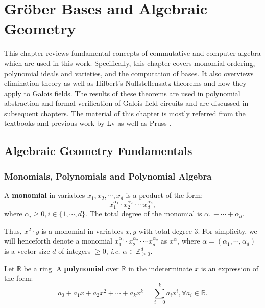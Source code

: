 \chapter{Gr\"ober Bases and Algebraic Geometry} \label{ch:ideals}
This chapter reviews fundamental concepts of commutative and 
computer algebra which are used in this work. 
Specifically, this chapter covers monomial ordering, polynomial ideals and 
varieties, and the computation of \Grobner bases.
It also overviews elimination theory as well as Hilbert's Nullstellensatz 
theorems and how
they apply to Galois fields. The results of these theorems are used in polynomial
abstraction and formal verification of Galois field circuits and 
are discussed 
in subsequent chapters. The material of this chapter is
mostly referred from the textbooks \cite{ideals:book,gb_book} and 
previous work by Lv \cite{lv:phd} as well as Pruss \cite{pruss:tcad15}.

\section{Algebraic Geometry Fundamentals}
\label{sec:geo}
\subsection{Monomials, Polynomials and Polynomial Algebra}
\begin{Definition} \label{def:mono}
A {\bf monomial} in variables $x_1,x_2,\cdots,x_d$ is a product of the form:
\begin{equation}
x_1^{{\alpha}_1} \cdot x_2^{{\alpha}_2} \cdot \cdots x_d^{{\alpha}_d},
\end{equation}
where $\alpha_i \ge 0, i\in\{1,\cdots,d\}$. 
The total degree of the monomial is $\alpha_{1}+\cdots+\alpha_{d}$.
\end{Definition} 

Thus, $x^2\cdot y$ is a monomial in variables $x,y$ with total degree $3$.
For simplicity, we will henceforth denote a 
monomial $x_1^{{\alpha}_1} \cdot x_2^
{{\alpha}_2} \cdot \cdots x_d^{{\alpha}_d}$ as $x^{\alpha}$, 
where $\alpha=({\alpha}_1,\cdots,{\alpha}_d)$ is a vector size $d$ of 
integers $\ge 0$, {\it i.e.} $\alpha \in \mathbb{Z}_{\ge 0}^{d}$.

\begin{Definition}\label{def:poly}
Let $\mathbb{R}$ be a ring. A {\bf polynomial} over $\mathbb{R}$ in the 
indeterminate $x$ is an expression of the form:
\begin{equation} \label{eq:poly1}
a_0 + a_1 x + a_2 x^2 + \cdots + a_k x^k = \sum_{i=0}^{k} a_i x^i, \forall a_i \in \mathbb{R}. 
\end{equation}

\end{Definition}

